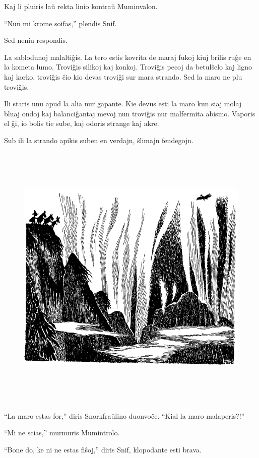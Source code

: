 Kaj li pluiris laŭ rekta linio kontraŭ Muminvalon.

``Nun mi krome soifas,'' plendis Snif.

Sed neniu respondis.

La sablodunoj malaltiĝis. La tero estis kovrita de maraj fukoj kiuj brilis ruĝe en la kometa lumo. Troviĝis silikoj kaj konkoj. Troviĝis pecoj da betulŝelo kaj ligno kaj korko, troviĝis ĉio kio devas troviĝi sur mara strando. Sed la maro ne plu troviĝis.

Ili staris unu apud la alia nur gapante. Kie devus esti la maro kun siaj molaj bluaj ondoj kaj balanciĝantaj mevoj nun troviĝis nur malfermita abismo. Vaporis el ĝi, io bolis tie sube, kaj odoris strange kaj akre.

Sub ili la strando apikis suben en verdajn, ŝlimajn fendegojn.

\begin{figure}[htbp]
\centering
\includegraphics[width=448pt,height=371pt]{7-2.png}
\caption{}
\label{7-2}
\end{figure}

``La maro estas for,'' diris Snorkfraŭlino duonvoĉe. ``Kial la maro malaperis?!''

``Mi ne scias,'' murmuris Mumintrolo.

``Bone do, ke ni ne estas fiŝoj,'' diris Snif, klopodante esti brava.

